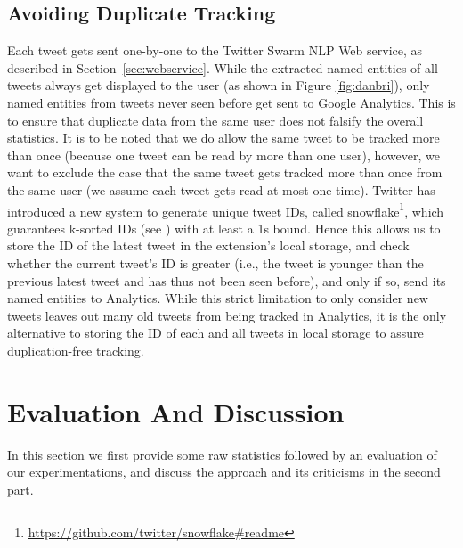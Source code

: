 \documentclass[runningheads,a4paper]{llncs}
\begin{document}
\subsection{Avoiding Duplicate Tracking}
Each tweet gets sent one-by-one to the Twitter Swarm NLP Web service, as described in Section~\ref{sec:webservice}. While the extracted named entities of all tweets always get displayed to the user (as shown in Figure \ref{fig:danbri}), only named entities from tweets never seen before get sent to Google Analytics. This is to ensure that duplicate data from the same user does not falsify the overall statistics. It is to be noted that we do allow the same tweet to be tracked more than once (because one tweet can be read by more than one user), however, we want to exclude the case that the same tweet gets tracked more than once from the same user (we assume each tweet gets read at most one time). Twitter has introduced a new system to generate unique tweet IDs, called snowflake\footnote{\url{https://github.com/twitter/snowflake#readme}}, which guarantees k-sorted IDs (see \cite{Altman:1989:RSS:70413.70419}) with at least a 1s bound. Hence this allows us to store the ID of the latest tweet in the extension's local storage, and check whether the current tweet's ID is greater (i.e., the tweet is younger than the previous latest tweet and has thus not been seen before), and only if so, send its named entities to Analytics. While this strict limitation to only consider new tweets leaves out many old tweets from being tracked in Analytics, it is the only alternative to storing the ID of each and all tweets in local storage to assure duplication-free tracking.

\section{Evaluation And Discussion}\label{sec:evaluation}
In this section we first provide some raw statistics followed by an evaluation of our experimentations, and discuss the approach and its criticisms in the second part.
\end{document}
